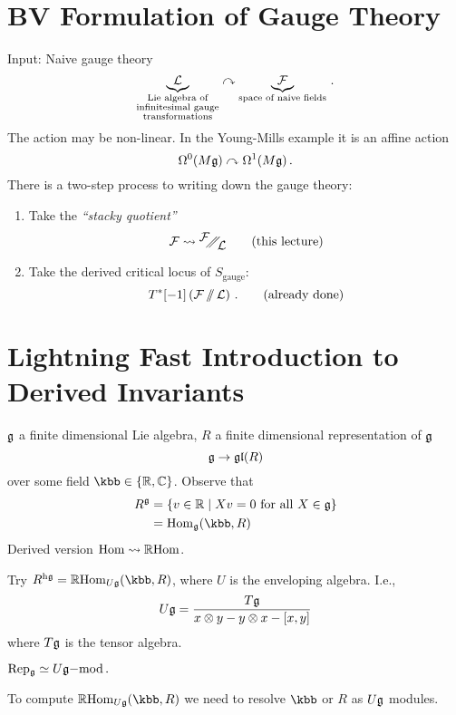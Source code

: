 \section{BV Formulation of Gauge Theory}

Input: Naive gauge theory
\begin{equation*}
\underbrace{\mathcal{L}}_{
  \substack{\text{Lie algebra of}\\
    \text{infinitesimal gauge}\\
    \text{transformations}} } \curvearrowright
\underbrace{\mathcal{F}}_{\text{space of naive fields}}\,.
\end{equation*}
The action may be non-linear. In the Young-Mills example it is an
affine action
\begin{equation*}
  \Omega^0 (M\mathfrak{g})\curvearrowright\Omega^1 (M\mathfrak{g})\,.
\end{equation*}
There is a two-step process to writing down the gauge theory:
\begin{enumerate}
\item Take the {\em ``stacky quotient''}
  \begin{equation*}
    \Fcal \rightsquigarrow \doublequotient{\Fcal}{\Lcal} \qquad \text{(this lecture)}
  \end{equation*}
\item Take the derived critical locus of $S_\text{gauge}$:
  \begin{equation*}
    T^*[-1]\left(\mathcal{F}\operatorname{/\mkern-6mu/}\mathcal{L}\right)\,. \qquad \text{(already done)}
  \end{equation*}
\end{enumerate}

\section{Lightning Fast Introduction to Derived Invariants}
$\mathfrak{g}$ a finite dimensional Lie algebra, $R$ a finite dimensional
representation of $\mathfrak{g}$
\begin{equation*}
  \mathfrak{g}\rightarrow\mathfrak{gl} (R)
\end{equation*}
over some field $\kbb\in\{\Rbb,\Cbb\}$.
Observe that
\begin{align*}
  R^{\gfrak}&=\{v\in \Rbb \mid Xv=0 \text{ for all } X\in\gfrak \}\\
          &=\mathrm{Hom}_{\gfrak} (\kbb,R)
\end{align*}
Derived version $\mathrm{Hom} \rightsquigarrow \mathbb{R}\mathrm{Hom}$.

Try $R^{\mathrm{h}\gfrak}=\Rbb\mathrm{Hom}_{U\gfrak} (\kbb,R)$, where
$U$ is the enveloping algebra. I.e.,
\begin{equation*}
  U\mathfrak{g}=\frac{T\mathfrak{g}}{x\otimes{}y-y\otimes{}x-[x,y]}
\end{equation*}
where $T\mathfrak{g}$ is the tensor algebra.
\begin{fact}
  $\mathrm{Rep_{\mathfrak{g}}}\simeq U\mathfrak{g}\mathrm{-mod}\,.$
\end{fact}
To compute $\Rbb\mathrm{Hom}_{U\gfrak} (\kbb,R)$ we need to resolve $\kbb$
or $R$ as $U\mathfrak{g}$ modules.

